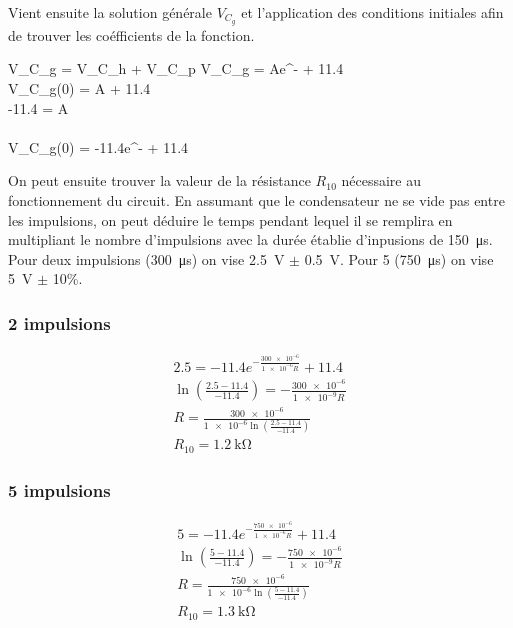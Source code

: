 \documentclass[a11paper, 11pt]{article}
\begin{document}
\begin{appendix}
	Vient ensuite la solution générale $V_{C_g}$ et l'application des conditions initiales
	afin de trouver les coéfficients de la fonction.

	\begin{DispWithArrows}[format=c]
		V_{C_g} = V_{C_h} + V_{C_p}
		V_{C_g} = Ae^{-} + 11.4  \\
		V_{C_g}(0) = A + 11.4 \\
		-11.4 = A \\
		\nonumber{}\\
		V_{C_g}(0) = -11.4e^{-} + 11.4
	\end{DispWithArrows}

	On peut ensuite trouver la valeur de la résistance $R_{10}$ nécessaire au fonctionnement
	du circuit.
	En assumant que le condensateur ne se vide pas entre les impulsions, on peut déduire le
	temps pendant lequel il se remplira en multipliant le nombre d'impulsions avec la durée
	établie d'inpusions de \SI{150}{\us}.
	Pour deux impulsions (\SI{300}{\us}) on vise \SI{2.5}{\V} $\pm$ \SI{0.5}{\V}.
	Pour 5  (\SI{750}{\us}) on vise \SI{5}{\V} $\pm$ 10\%.

	\subsubsection{2 impulsions}
	\begin{gather}
		2.5 = -11.4e^{-\frac{\num{300e-6}}{\num{1e-6}R}} + 11.4\\
		\ln\left(\frac{2.5 - 11.4}{-11.4}\right) = -\frac{\num{300e-6}}{\num{1e-9}R}\\
		R = \frac{\num{300e-6}}{\num{1e-6}\ln\left(\frac{2.5 - 11.4}{-11.4}\right)}\\
		R_{10} = \SI{1.2}{\kohm}
	\end{gather}

	\subsubsection{5 impulsions}
	\begin{gather}
		5 = -11.4e^{-\frac{\num{750e-6}}{\num{1e-6}R}} + 11.4\\
		\ln\left(\frac{5 - 11.4}{-11.4}\right) = -\frac{\num{750e-6}}{\num{1e-9}R}\\
		R = \frac{\num{750e-6}}{\num{1e-6}\ln\left(\frac{5 - 11.4}{-11.4}\right)}\\
		R_{10} = \SI{1.3}{\kohm}
	\end{gather}


\end{appendix}
\end{document}
